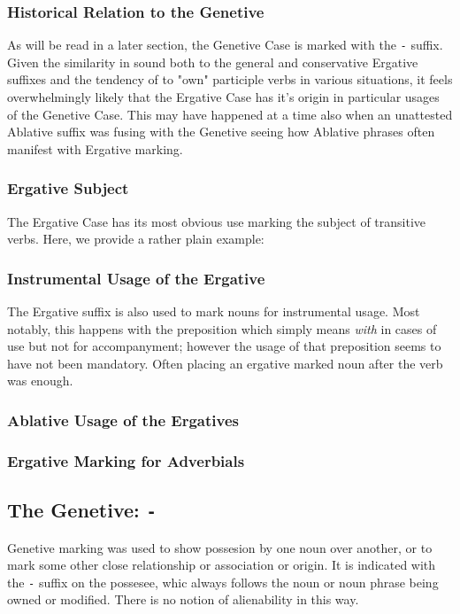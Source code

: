   \subsubsection{Historical Relation to the Genetive}
  As will be read in a later section, the Genetive Case is marked with the \texttt{-\gen} suffix. Given the similarity in sound both to the general and conservative Ergative suffixes and the tendency of \langname to "own" participle verbs in various situations, it feels overwhelmingly likely that the Ergative Case has it's origin in particular usages of the Genetive Case. This may have happened at a time also when an unattested Ablative suffix was fusing with the Genetive seeing how Ablative phrases often manifest with Ergative marking.
  \subsubsection{Ergative Subject}
  The Ergative Case has its most obvious use marking the subject of transitive verbs. Here, we provide a rather plain example:
  \subsubsection{Instrumental Usage of the Ergative}
  The Ergative suffix is also used to mark nouns for instrumental usage. Most notably, this happens with the preposition \instruprep\space which simply means \textit{with} in cases of use but not for accompanyment; however the usage of that preposition seems to have not been mandatory. Often placing an ergative marked noun after the verb was enough.
  \subsubsection{Ablative Usage of the Ergatives}
  \subsubsection{Ergative Marking for Adverbials}

\subsection{The Genetive: \texttt{-\gen}}
Genetive marking was used to show possesion by one noun over another, or to mark some other close relationship or association or origin. It is indicated with the \texttt{-\gen} suffix on the possesee, whic always follows the noun or noun phrase being owned or modified. There is no notion of alienability in this way.
